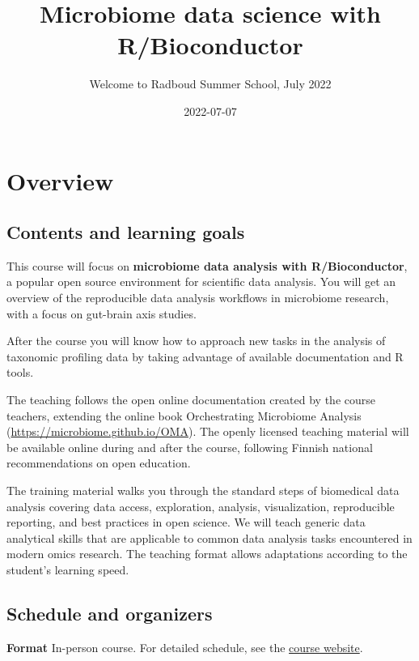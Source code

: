 \documentclass[
  oneside]{book}
\title{Microbiome data science with R/Bioconductor}
\subtitle{Welcome to Radboud Summer School, July 2022}
\author{}
\date{\vspace{-2.5em}2022-07-07}
\begin{document}
\maketitle

{
\setcounter{tocdepth}{1}
\tableofcontents
}
\hypertarget{overview}{%
\chapter{Overview}\label{overview}}

\hypertarget{contents-and-learning-goals}{%
\section{Contents and learning goals}\label{contents-and-learning-goals}}

This course will focus on \textbf{microbiome data analysis
with R/Bioconductor}, a popular open source environment for
scientific data analysis. You will get an overview of the
reproducible data analysis workflows in microbiome research, with a
focus on gut-brain axis studies.

After the course you will know how to approach new tasks in the
analysis of taxonomic profiling data by taking advantage of available
documentation and R tools.

The teaching follows the open online documentation created by the
course teachers, extending the online book Orchestrating Microbiome
Analysis (\url{https://microbiome.github.io/OMA}). The openly licensed
teaching material will be available online during and after the
course, following Finnish national recommendations on open education.

The training material walks you through the standard steps of
biomedical data analysis covering data access, exploration, analysis,
visualization, reproducible reporting, and best practices in open
science. We will teach generic data analytical skills that are
applicable to common data analysis tasks encountered in modern omics
research. The teaching format allows adaptations according to the
student's learning speed.

\hypertarget{schedule-and-organizers}{%
\section{Schedule and organizers}\label{schedule-and-organizers}}

\textbf{Format} In-person course. For detailed schedule, see the
\href{https://www.ru.nl/radboudsummerschool/courses/2022/registration-longer-possible-brain-bacteria}{course
website}.
\end{document}
